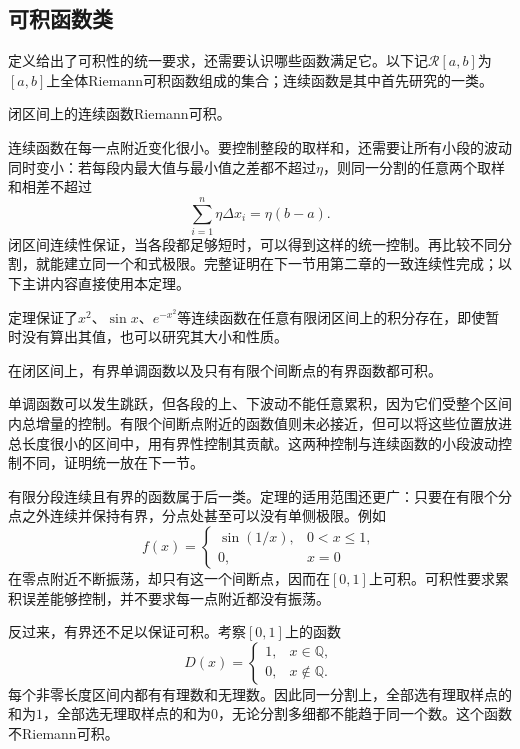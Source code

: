 \subsection{可积函数类}

定义给出了可积性的统一要求，还需要认识哪些函数满足它。以下记\(\mathcal R[a,b]\)为\([a,b]\)上全体Riemann可积函数组成的集合；连续函数是其中首先研究的一类。

\begin{theorem}\label{thm:calculus-continuous-integrable}
闭区间上的连续函数Riemann可积。
\end{theorem}

连续函数在每一点附近变化很小。要控制整段的取样和，还需要让所有小段的波动同时变小：若每段内最大值与最小值之差都不超过\(\eta\)，则同一分割的任意两个取样和相差不超过
\begin{equation*}
 \sum_{i=1}^n\eta\Delta x_i=\eta(b-a).
\end{equation*}
闭区间连续性保证，当各段都足够短时，可以得到这样的统一控制。再比较不同分割，就能建立同一个和式极限。完整证明在下一节用第二章的一致连续性完成；以下主讲内容直接使用本定理。

定理保证了\(x^2\)、\(\sin x\)、\(e^{-x^2}\)等连续函数在任意有限闭区间上的积分存在，即使暂时没有算出其值，也可以研究其大小和性质。

\begin{theorem}\label{thm:calculus-other-integrable-classes}
在闭区间上，有界单调函数以及只有有限个间断点的有界函数都可积。
\end{theorem}

单调函数可以发生跳跃，但各段的上、下波动不能任意累积，因为它们受整个区间内总增量的控制。有限个间断点附近的函数值则未必接近，但可以将这些位置放进总长度很小的区间中，用有界性控制其贡献。这两种控制与连续函数的小段波动控制不同，证明统一放在下一节。

有限分段连续且有界的函数属于后一类。定理的适用范围还更广：只要在有限个分点之外连续并保持有界，分点处甚至可以没有单侧极限。例如
\begin{equation*}
 f(x)=\begin{cases}\sin(1/x),&0<x\le1,\\0,&x=0\end{cases}
\end{equation*}
在零点附近不断振荡，却只有这一个间断点，因而在\([0,1]\)上可积。可积性要求累积误差能够控制，并不要求每一点附近都没有振荡。

反过来，有界还不足以保证可积。考察\([0,1]\)上的函数
\begin{equation*}
 D(x)=\begin{cases}1,&x\in\mathbb Q,\\0,&x\notin\mathbb Q.\end{cases}
\end{equation*}
每个非零长度区间内都有有理数和无理数。因此同一分割上，全部选有理取样点的和为\(1\)，全部选无理取样点的和为\(0\)，无论分割多细都不能趋于同一个数。这个函数不Riemann可积。

